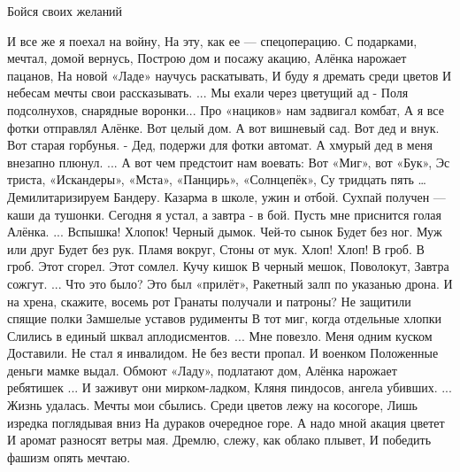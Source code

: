  
 
 
 
 

Бойся своих желаний

\obeycr
И все же я поехал на войну,
На эту, как ее — спецоперацию.
С подарками, мечтал, домой вернусь,
Построю дом и посажу акацию,
Алёнка нарожает пацанов,
На новой «Ладе» научусь раскатывать,
И буду я дремать среди цветов
И небесам мечты свои рассказывать.
...
Мы ехали через цветущий ад -
Поля подсолнухов, снарядные воронки...
Про «нациков» нам задвигал комбат,
А я все фотки отправлял Алёнке.
Вот целый дом. А вот вишневый сад.
Вот дед и внук. Вот старая горбунья.
- Дед, подержи для фотки автомат.
А хмурый дед в меня внезапно плюнул.
...
А вот чем предстоит нам воевать:
Вот «Миг», вот «Бук», Эс триста, «Искандеры»,
«Мста», «Панцирь», «Солнцепёк», Су тридцать пять …
Демилитаризируем Бандеру.
Казарма в школе, ужин и отбой.
Сухпай получен — каши да тушонки.
Сегодня я устал, а завтра - в бой.
Пусть мне приснится голая Алёнка.
...
Вспышка! Хлопок!
Черный дымок.
Чей-то сынок
Будет без ног.
Муж или друг
Будет без рук.
Пламя вокруг,
Стоны от мук.
Хлоп! Хлоп!
В гроб. В гроб.
Этот сгорел.
Этот сомлел.
Кучу кишок
В черный мешок,
Поволокут,
Завтра сожгут.
...
Что это было? Это был «прилёт»,
Ракетный залп по указанью дрона.
И на хрена, скажите, восемь рот
Гранаты получали и патроны?
Не защитили спящие полки
Замшелые уставов рудименты
В тот миг, когда отдельные хлопки
Слились в единый шквал аплодисментов.
...
Мне повезло. Меня одним куском
Доставили. Не стал я инвалидом.
Не без вести пропал. И военком
Положенные деньги мамке выдал.
Обмоют «Ладу», подлатают дом,
Алёнка нарожает ребятишек ...
И заживут они мирком-ладком,
Кляня пиндосов, ангела убивших.
...
Жизнь удалась. Мечты мои сбылись.
Среди цветов лежу на косогоре,
Лишь изредка поглядывая вниз
На дураков очередное горе.
А надо мной акация цветет
И аромат разносят ветры мая.
Дремлю, слежу, как облако плывет,
И победить фашизм опять мечтаю.
\restorecr

